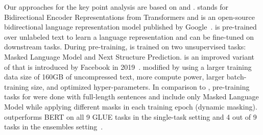 Our approaches for the key point analysis are based on \Bert and \Roberta. \Bert stands for Bidirectional Encoder Representations from Transformers and is an open-source bidirectional language representation model published by Google~\cite{DevlinCLT2019}. \Bert is pre-trained over unlabeled text to learn a language representation and can be fine-tuned on downstream tasks. During pre-training, \Bert is trained on two unsupervised tasks: Masked Language Model and Next Structure Prediction. \Roberta is an improved variant of \Bert that is introduced by Facebook in 2019~\cite{LiuOGDJCLLZS2019}. \citet{LiuOGDJCLLZS2019} modified \Bert by using a larger training data size of 160GB of uncompressed text, more compute power, larger batch-training size, and optimized hyper-parameters. In comparison to \Bert, pre-training tasks for \Roberta were done with full-length sentences and include only Masked Language Model while applying different masks in each training epoch (dynamic masking). \Roberta outperforms BERT on all 9 GLUE tasks in the single-task setting and 4 out of 9 tasks in the ensembles setting~\cite{WangSMHLB2018,LiuOGDJCLLZS2019}.







